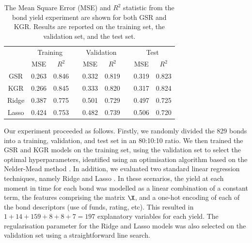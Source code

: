\begin{table}[t] 
    \centering
    \def\arraystretch{1.5} 
    \begin{tabular}{@{}ccccccccc}
    \toprule
    & \multicolumn{2}{c}{Training} & \phantom{abc} & \multicolumn{2}{c}{Validation} & \phantom{abc} & \multicolumn{2}{c}{Test} \\
    \cmidrule{2-3} \cmidrule{5-6} \cmidrule{8-9}
    & MSE  & $R^2$  &&  MSE  & $R^2$ &&  MSE  & $R^2$  \\ \midrule \rule{0pt}{1cm}

    GSR & 0.263 & 0.846 && 0.332 & 0.819 && 0.319 & 0.823 \\ \rule{0pt}{6ex}
    
    KGR & 0.266 & 0.845 &&  0.333 & 0.820 && 0.317 & 0.824 \\\rule{0pt}{6ex}
    
    Ridge & 0.387 & 0.775 && 0.501 & 0.729 && 0.497 & 0.725 \\ \rule{0pt}{6ex}
    
    Lasso &  0.424 & 0.753 && 0.482 & 0.739 && 0.506 & 0.720 \\[0.5cm] 

    \bottomrule 
    \end{tabular}
    \caption[Results for bond yield experiments]{The Mean Square Error (MSE) and $R^2$ statistic from the bond yield experiment are shown for both GSR and KGR. Results are reported on the training set, the validation set, and the test set. }
    \label{tab:bond_yield_results} 
\end{table}

Our experiment proceeded as follows. Firstly, we randomly divided the 829 bonds into a training, validation, and test set in an 80:10:10 ratio. We then trained the GSR and KGR models on the training set, using the validation set to select the optimal hyperparameters, identified using an optimisation algorithm based on the Nelder-Mead method \citep{Gao2012}. In addition, we evaluated two standard linear regression techniques, namely Ridge and Lasso \citep{Murphy2012}. In these scenarios, the yield at each moment in time for each bond was modelled as a linear combination of a constant term, the features comprising the matrix $\X$, and a one-hot encoding of each of the bond descriptors (use of funds, rating, etc). This resulted in $1 + 14 + 159 + 8 + 8 + 7 = 197$ explanatory variables for each yield. The regularisation parameter for the Ridge and Lasso models was also selected on the validation set using a straightforward line search.

